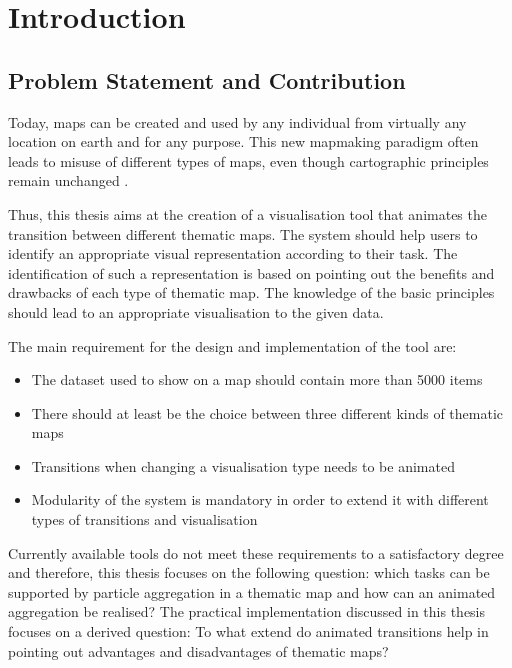 \section{Introduction}


\subsection{Problem Statement and Contribution}
Today, maps can be created and used by any individual from virtually any location on earth and for any purpose. This new mapmaking paradigm often leads to misuse of different types of maps, even though cartographic principles remain unchanged .

Thus, this thesis aims at the creation of a visualisation tool that animates the transition between different thematic maps. The system should help users to identify an appropriate visual representation according to their task. The identification of such a representation is based on pointing out the benefits and drawbacks of each type of thematic map. The knowledge of the basic principles should lead to an appropriate visualisation to the given data.

The main requirement for the design and implementation of the tool are:
\begin{itemize}
\item The dataset used to show on a map should contain more than 5000 items
\item There should at least be the choice between three different kinds of thematic maps
\item Transitions when changing a visualisation type needs to be animated
\item Modularity of the system is mandatory in order to extend it with different types of transitions and visualisation
\end{itemize}
Currently available tools do not meet these requirements to a satisfactory degree and therefore, this thesis focuses on the following question:
which tasks can be supported by particle aggregation in a thematic map and how can an animated aggregation be realised? The practical implementation discussed in this thesis focuses on a derived question: To what extend do animated transitions help in pointing out advantages and disadvantages of thematic maps?

